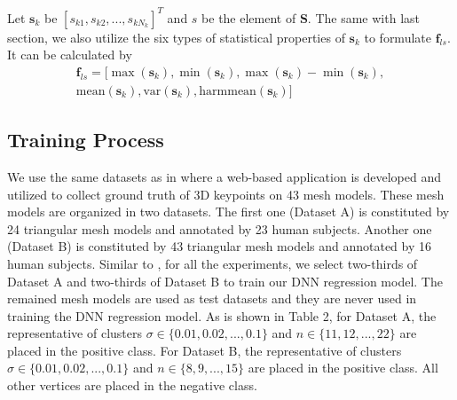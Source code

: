 \documentclass[runningheads]{article}
\begin{document}
Let \emph{$\bm{s}_k$} be \emph{$[s_{k1},s_{k2},...,s_{kN_k}]^T$} and \emph{$s$} be the element of \emph{$\bm{S}$}. The same with last section, we also utilize the six types of statistical properties of \emph{$\bm{s}_k$} to formulate \emph{$\bm{f}_{ls}$}. It can be calculated by
\begin{equation}
	\begin{split}
		\bm{f}_{ls} = [\max(\bm{s}_k),\min(\bm{s}_k),\max(\bm{s}_k)-\min(\bm{s}_k),\\
		\text{mean}(\bm{s}_k),\text{var}(\bm{s}_k),\text{harmmean}(\bm{s}_k)] \ \ \ \ \ \ \
	\end{split}
\end{equation}

\subsection{Training Process}
We use the same datasets as in \cite{song20133d,randomforest20143d,dutagaci2012evaluation} where a web-based application is developed and utilized to collect ground truth of 3D keypoints on 43 mesh models. These mesh models are organized in two datasets. The first one (Dataset A) is constituted by 24 triangular mesh models and annotated by 23 human subjects. Another one (Dataset B) is constituted by 43 triangular mesh models and annotated by 16 human subjects. Similar to \cite{randomforest20143d}, for all the experiments, we select two-thirds of Dataset A and two-thirds of Dataset B to train our DNN regression model. The remained mesh models are used as test datasets and they are never used in training the DNN regression model. As is shown in Table 2, for Dataset A, the representative of clusters \emph{$\sigma \in \{0.01,0.02,...,0.1\}$} and \emph{$n\in \{11,12,...,22\}$} are placed in the positive class. For Dataset B, the representative of clusters \emph{$\sigma \in \{0.01,0.02,...,0.1\}$} and \emph{$n\in \{8,9,...,15\}$} are placed in the positive class. All other vertices are placed in the negative class.
\end{document}
